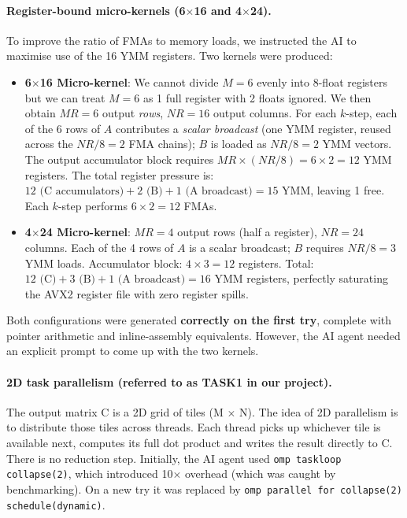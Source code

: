 \documentclass[11pt,a4paper]{article}
\begin{document}
\paragraph{Register-bound micro-kernels (6$\times$16 and 4$\times$24).}
To improve the ratio of FMAs to memory loads, we instructed the AI to maximise use of the 16 YMM registers. Two kernels were produced:
\begin{itemize}
  \item \textbf{6$\times$16 Micro-kernel}: We cannot divide $M=6$ evenly into 8-float registers but we can treat $M=6$ as 1 full register with 2 floats ignored. We then obtain $MR=6$ output \emph{rows}, $NR=16$ output columns. For each $k$-step, each of the 6 rows of $A$ contributes a \emph{scalar broadcast} (one YMM register, reused across the $NR/8=2$ FMA chains); $B$ is loaded as $NR/8 = 2$ YMM vectors. The output accumulator block requires $MR \times (NR/8) = 6 \times 2 = 12$ YMM registers. The total register pressure is: $12 \text{ (C accumulators)} + 2 \text{ (B)} + 1 \text{ (A broadcast)} = 15$ YMM, leaving 1 free. Each $k$-step performs $6 \times 2 = 12$ FMAs.
  \item \textbf{4$\times$24 Micro-kernel}: $MR=4$ output rows (half a register), $NR=24$ columns. Each of the 4 rows of $A$ is a scalar broadcast; $B$ requires $NR/8 = 3$ YMM loads. Accumulator block: $4 \times 3 = 12$ registers. Total: $12 \text{ (C)} + 3 \text{ (B)} + 1 \text{ (A broadcast)} = 16$ YMM registers, perfectly saturating the AVX2 register file with zero register spills.
\end{itemize}
Both configurations were generated \textbf{correctly on the first try}, complete with pointer arithmetic and inline-assembly equivalents. However, the AI agent needed an explicit prompt to come up with the two kernels.

\paragraph{2D task parallelism (referred to as TASK1 in our project).}
The output matrix C is a 2D grid of tiles (M $\times$ N). The idea of 2D parallelism is to distribute those tiles across threads. Each thread picks up whichever tile is available next, computes its full dot product and writes the result directly to C. There is no reduction step. Initially, the AI agent used \texttt{omp taskloop collapse(2)}, which introduced 10$\times$ overhead (which was caught by benchmarking). On a new try it was replaced by \texttt{omp parallel for collapse(2) schedule(dynamic)}.
\end{document}
